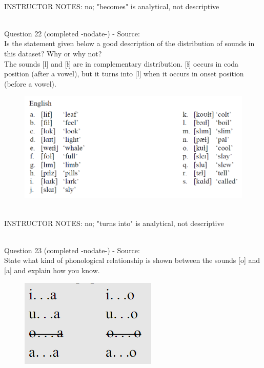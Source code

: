 \documentclass[12pt]{article}
\begin{document}
~\\
INSTRUCTOR NOTES: no; "becomes" is analytical, not descriptive


~\\

{\large Question 22} (completed -nodate-) - Source: \\

Is the statement given below a good description of the distribution of sounds in this dataset? Why or why not?\\

The sounds {[l]} and {[ɫ]} are in complementary distribution. {[ɫ]} occurs in coda position (after a vowel), but it turns into {[l]} when it occurs in onset position (before a vowel).

\begin{figure}[H]
\includegraphics{../images/english_laterals.png}
\end{figure}

~\\
INSTRUCTOR NOTES: no; "turns into" is analytical, not descriptive


~\\

{\large Question 23} (completed -nodate-) - Source: \\

State what kind of phonological relationship is shown between the sounds [o] and [a] and explain how you know.\\

\begin{figure}[H]
\includegraphics{../images/peng70ao_a.png}
\end{figure}
\end{document}
